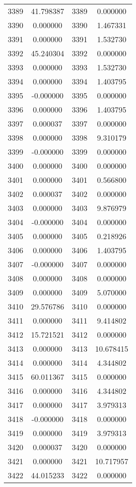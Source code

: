 \documentclass[12pt]{article}
\begin{document}
\begin{longtable}{@{}cccc@{}}
3389 & 41.798387 & 3389 & 0.000000 \\
3390 & 0.000000 & 3390 & 1.467331 \\
3391 & 0.000000 & 3391 & 1.532730 \\
3392 & 45.240304 & 3392 & 0.000000 \\
3393 & 0.000000 & 3393 & 1.532730 \\
3394 & 0.000000 & 3394 & 1.403795 \\
3395 & -0.000000 & 3395 & 0.000000 \\
3396 & 0.000000 & 3396 & 1.403795 \\
3397 & 0.000037 & 3397 & 0.000000 \\
3398 & 0.000000 & 3398 & 9.310179 \\
3399 & -0.000000 & 3399 & 0.000000 \\
3400 & 0.000000 & 3400 & 0.000000 \\
3401 & 0.000000 & 3401 & 0.566800 \\
3402 & 0.000037 & 3402 & 0.000000 \\
3403 & 0.000000 & 3403 & 9.876979 \\
3404 & -0.000000 & 3404 & 0.000000 \\
3405 & 0.000000 & 3405 & 0.218926 \\
3406 & 0.000000 & 3406 & 1.403795 \\
3407 & -0.000000 & 3407 & 0.000000 \\
3408 & 0.000000 & 3408 & 0.000000 \\
3409 & 0.000000 & 3409 & 5.070000 \\
3410 & 29.576786 & 3410 & 0.000000 \\
3411 & 0.000000 & 3411 & 9.414802 \\
3412 & 15.721521 & 3412 & 0.000000 \\
3413 & 0.000000 & 3413 & 10.678415 \\
3414 & 0.000000 & 3414 & 4.344802 \\
3415 & 60.011367 & 3415 & 0.000000 \\
3416 & 0.000000 & 3416 & 4.344802 \\
3417 & 0.000000 & 3417 & 3.979313 \\
3418 & -0.000000 & 3418 & 0.000000 \\
3419 & 0.000000 & 3419 & 3.979313 \\
3420 & 0.000037 & 3420 & 0.000000 \\
3421 & 0.000000 & 3421 & 10.717957 \\
3422 & 44.015233 & 3422 & 0.000000 \\

\end{longtable}
\end{document}

